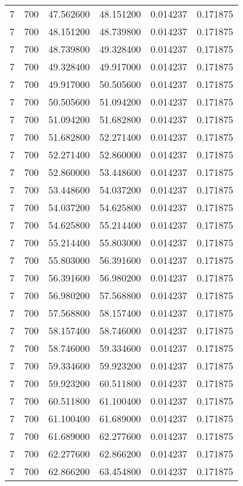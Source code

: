 \begin{longtable}{rrrrrr}
7 & 700 & 47.562600 & 48.151200 & 0.014237 & 0.171875 \\
7 & 700 & 48.151200 & 48.739800 & 0.014237 & 0.171875 \\
7 & 700 & 48.739800 & 49.328400 & 0.014237 & 0.171875 \\
7 & 700 & 49.328400 & 49.917000 & 0.014237 & 0.171875 \\
7 & 700 & 49.917000 & 50.505600 & 0.014237 & 0.171875 \\
7 & 700 & 50.505600 & 51.094200 & 0.014237 & 0.171875 \\
7 & 700 & 51.094200 & 51.682800 & 0.014237 & 0.171875 \\
7 & 700 & 51.682800 & 52.271400 & 0.014237 & 0.171875 \\
7 & 700 & 52.271400 & 52.860000 & 0.014237 & 0.171875 \\
7 & 700 & 52.860000 & 53.448600 & 0.014237 & 0.171875 \\
7 & 700 & 53.448600 & 54.037200 & 0.014237 & 0.171875 \\
7 & 700 & 54.037200 & 54.625800 & 0.014237 & 0.171875 \\
7 & 700 & 54.625800 & 55.214400 & 0.014237 & 0.171875 \\
7 & 700 & 55.214400 & 55.803000 & 0.014237 & 0.171875 \\
7 & 700 & 55.803000 & 56.391600 & 0.014237 & 0.171875 \\
7 & 700 & 56.391600 & 56.980200 & 0.014237 & 0.171875 \\
7 & 700 & 56.980200 & 57.568800 & 0.014237 & 0.171875 \\
7 & 700 & 57.568800 & 58.157400 & 0.014237 & 0.171875 \\
7 & 700 & 58.157400 & 58.746000 & 0.014237 & 0.171875 \\
7 & 700 & 58.746000 & 59.334600 & 0.014237 & 0.171875 \\
7 & 700 & 59.334600 & 59.923200 & 0.014237 & 0.171875 \\
7 & 700 & 59.923200 & 60.511800 & 0.014237 & 0.171875 \\
7 & 700 & 60.511800 & 61.100400 & 0.014237 & 0.171875 \\
7 & 700 & 61.100400 & 61.689000 & 0.014237 & 0.171875 \\
7 & 700 & 61.689000 & 62.277600 & 0.014237 & 0.171875 \\
7 & 700 & 62.277600 & 62.866200 & 0.014237 & 0.171875 \\
7 & 700 & 62.866200 & 63.454800 & 0.014237 & 0.171875 \\

\end{longtable}
